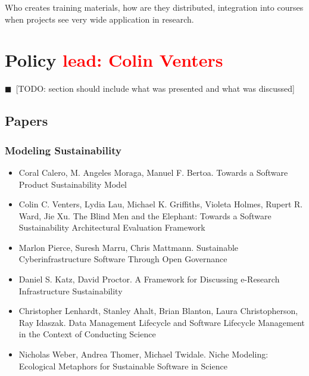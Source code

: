 \documentclass[11pt, oneside]{amsart}
\newcommand{\todo}[1]{{\color{blue}$\blacksquare$~\textsf{[TODO: #1]}}}
\newcommand{\note}[1]{ {\textcolor{red}    { #1 }}}
\begin{document}
Who creates training materials, how are they distributed, integration
into courses when projects see very wide application in research.

\section{Policy \note{lead: Colin Venters}} \label{sec:policy}

\todo{section should include what was presented and what was discussed}

\subsection*{Papers}

\subsubsection*{Modeling Sustainability}

\begin{itemize}

\item Coral Calero, M. Angeles Moraga, Manuel F. Bertoa. Towards a
  Software Product Sustainability Model \cite{Calero_WSSSPE}

\item Colin C. Venters, Lydia Lau, Michael K. Griffiths, Violeta
  Holmes, Rupert R. Ward, Jie Xu. The Blind Men and the Elephant:
  Towards a Software Sustainability Architectural Evaluation Framework
  \cite{Venters_WSSSPE}

\item Marlon Pierce, Suresh Marru, Chris Mattmann. Sustainable
  Cyberinfrastructure Software Through Open Governance
  \cite{Pierce_WSSSPE}

\item Daniel S. Katz, David Proctor. A Framework for Discussing
  e-Research Infrastructure Sustainability \cite{Katz_WSSSPE}

\item Christopher Lenhardt, Stanley Ahalt, Brian Blanton, Laura
  Christopherson, Ray Idaszak. Data Management Lifecycle and Software
  Lifecycle Management in the Context of Conducting Science
  \cite{Lenhardt_WSSSPE}

\item Nicholas Weber, Andrea Thomer, Michael Twidale. Niche Modeling:
  Ecological Metaphors for Sustainable Software in Science
  \cite{Weber_WSSSPE}

\end{itemize}
\end{document}

